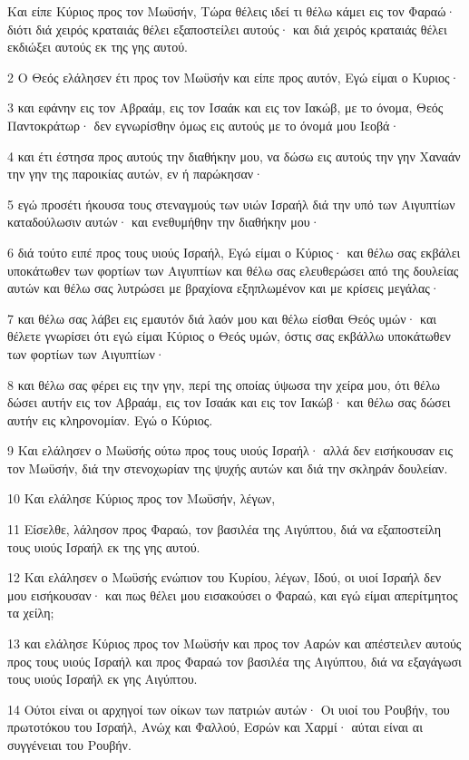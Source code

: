 \par Και είπε Κύριος προς τον Μωϋσήν, Τώρα θέλεις ιδεί τι θέλω κάμει εις τον Φαραώ· διότι διά χειρός κραταιάς θέλει εξαποστείλει αυτούς· και διά χειρός κραταιάς θέλει εκδιώξει αυτούς εκ της γης αυτού.
\par 2 Ο Θεός ελάλησεν έτι προς τον Μωϋσήν και είπε προς αυτόν, Εγώ είμαι ο Κυριος·
\par 3 και εφάνην εις τον Αβραάμ, εις τον Ισαάκ και εις τον Ιακώβ, με το όνομα, Θεός Παντοκράτωρ· δεν εγνωρίσθην όμως εις αυτούς με το όνομά μου Ιεοβά·
\par 4 και έτι έστησα προς αυτούς την διαθήκην μου, να δώσω εις αυτούς την γην Χαναάν την γην της παροικίας αυτών, εν ή παρώκησαν·
\par 5 εγώ προσέτι ήκουσα τους στεναγμούς των υιών Ισραήλ διά την υπό των Αιγυπτίων καταδούλωσιν αυτών· και ενεθυμήθην την διαθήκην μου·
\par 6 διά τούτο ειπέ προς τους υιούς Ισραήλ, Εγώ είμαι ο Κύριος· και θέλω σας εκβάλει υποκάτωθεν των φορτίων των Αιγυπτίων και θέλω σας ελευθερώσει από της δουλείας αυτών και θέλω σας λυτρώσει με βραχίονα εξηπλωμένον και με κρίσεις μεγάλας·
\par 7 και θέλω σας λάβει εις εμαυτόν διά λαόν μου και θέλω είσθαι Θεός υμών· και θέλετε γνωρίσει ότι εγώ είμαι Κύριος ο Θεός υμών, όστις σας εκβάλλω υποκάτωθεν των φορτίων των Αιγυπτίων·
\par 8 και θέλω σας φέρει εις την γην, περί της οποίας ύψωσα την χείρα μου, ότι θέλω δώσει αυτήν εις τον Αβραάμ, εις τον Ισαάκ και εις τον Ιακώβ· και θέλω σας δώσει αυτήν εις κληρονομίαν. Εγώ ο Κύριος.
\par 9 Και ελάλησεν ο Μωϋσής ούτω προς τους υιούς Ισραήλ· αλλά δεν εισήκουσαν εις τον Μωϋσήν, διά την στενοχωρίαν της ψυχής αυτών και διά την σκληράν δουλείαν.
\par 10 Και ελάλησε Κύριος προς τον Μωϋσήν, λέγων,
\par 11 Είσελθε, λάλησον προς Φαραώ, τον βασιλέα της Αιγύπτου, διά να εξαποστείλη τους υιούς Ισραήλ εκ της γης αυτού.
\par 12 Και ελάλησεν ο Μωϋσής ενώπιον του Κυρίου, λέγων, Ιδού, οι υιοί Ισραήλ δεν μου εισήκουσαν· και πως θέλει μου εισακούσει ο Φαραώ, και εγώ είμαι απερίτμητος τα χείλη;
\par 13 και ελάλησε Κύριος προς τον Μωϋσήν και προς τον Ααρών και απέστειλεν αυτούς προς τους υιούς Ισραήλ και προς Φαραώ τον βασιλέα της Αιγύπτου, διά να εξαγάγωσι τους υιούς Ισραήλ εκ γης Αιγύπτου.
\par 14 Ούτοι είναι οι αρχηγοί των οίκων των πατριών αυτών· Οι υιοί του Ρουβήν, του πρωτοτόκου του Ισραήλ, Ανώχ και Φαλλού, Εσρών και Χαρμί· αύται είναι αι συγγένειαι του Ρουβήν.
